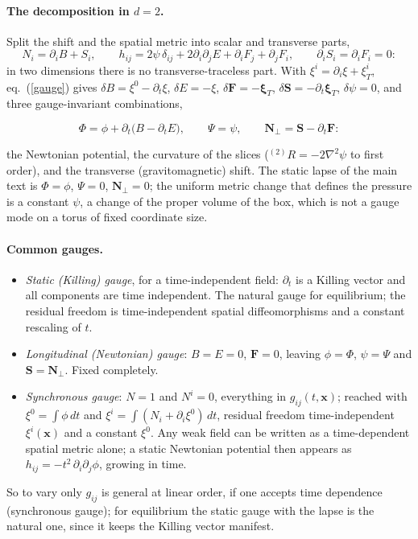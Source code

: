 \documentclass[11pt,aps,preprint,nofootinbib,superscriptaddress,tightenlines]{revtex4-2}
\def\st{\begin{equation}}
\def\stp{\end{equation}}
\def\Eq#1{eq.~(\ref{#1})}
\let\oldparagraph\paragraph
\renewcommand{\paragraph}{\par\bigskip\oldparagraph}
\begin{document}
\paragraph{The decomposition in $d=2$.}  Split the shift and the spatial metric into scalar and transverse parts,
\st
N_i=\partial_iB+S_i,\qquad h_{ij}=2\psi\,\delta_{ij}+2\partial_i\partial_jE+\partial_iF_j+\partial_jF_i,\qquad \partial_iS_i=\partial_iF_i=0 :
\stp
in two dimensions there is no transverse-traceless part.  With $\xi^i=\partial_i\xi+\xi^i_T$, \Eq{gauge} gives $\delta B=\xi^0-\partial_t\xi$, $\delta E=-\xi$,
$\delta\bm F=-\bm\xi_T$, $\delta\bm S=-\partial_t\bm\xi_T$, $\delta\psi=0$, and three gauge-invariant combinations,
\begin{keyeq}
\st
\Phi=\phi+\partial_t\big(B-\partial_tE\big),\qquad \Psi=\psi,\qquad \bm N_\perp=\bm S-\partial_t\bm F :
\stp
\end{keyeq}
the Newtonian potential, the curvature of the slices ($^{(2)}\!R=-2\nabla^2\psi$ to first order), and the transverse (gravitomagnetic) shift.  The static lapse of the main
text is $\Phi=\phi$, $\Psi=0$, $\bm N_\perp=0$; the uniform metric change that defines the pressure is a constant $\psi$, a change of the proper volume of the box, which is not a
gauge mode on a torus of fixed coordinate size.

\paragraph{Common gauges.}
\begin{itemize}
\item \emph{Static (Killing) gauge}, for a time-independent field: $\partial_t$ is a Killing vector and all components are time independent.  The natural gauge for
  equilibrium; the residual freedom is time-independent spatial diffeomorphisms and a constant rescaling of $t$.
\item \emph{Longitudinal (Newtonian) gauge}: $B=E=0$, $\bm F=0$, leaving $\phi=\Phi$, $\psi=\Psi$ and $\bm S=\bm N_\perp$.  Fixed completely.
\item \emph{Synchronous gauge}: $N=1$ and $N^i=0$, everything in $g_{ij}(t,\bm x)$; reached with $\xi^0=\int\phi\,dt$ and $\xi^i=\int(N_i+\partial_i\xi^0)\,dt$, residual
  freedom time-independent $\xi^i(\bm x)$ and a constant $\xi^0$.  Any weak field can be written as a time-dependent spatial metric alone; a static Newtonian potential
  then appears as $h_{ij}=-t^2\,\partial_i\partial_j\phi$, growing in time.
\end{itemize}
So to vary only $g_{ij}$ is general at linear order, if one accepts time dependence (synchronous gauge); for equilibrium the static gauge with the lapse is the
natural one, since it keeps the Killing vector manifest.
\end{document}
